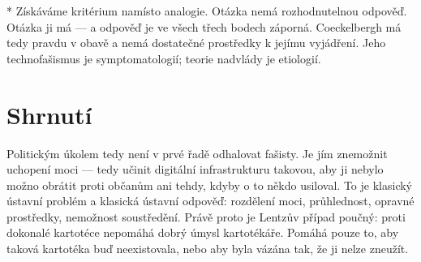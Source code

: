 * Získáváme kritérium namísto analogie. Otázka  nemá rozhodnutelnou odpověď.
Otázka  ji má — a odpověď je ve všech třech bodech záporná.
Coeckelbergh má tedy pravdu v obavě a nemá dostatečné prostředky k jejímu vyjádření. Jeho technofašismus je symptomatologií; teorie nadvlády je etiologií.
\section{Shrnutí}
Politickým úkolem tedy není v prvé řadě odhalovat fašisty.
Je jím znemožnit uchopení moci — tedy učinit digitální infrastrukturu takovou, aby ji nebylo možno obrátit proti občanům ani tehdy, kdyby o to někdo usiloval.
To je klasický ústavní problém a klasická ústavní odpověď: rozdělení moci, průhlednost, opravné prostředky, nemožnost soustředění.
Právě proto je Lentzův případ poučný: proti dokonalé kartotéce nepomáhá dobrý úmysl kartotékáře. Pomáhá pouze to, aby taková kartotéka buď neexistovala, nebo aby byla vázána tak, že ji nelze zneužít.
